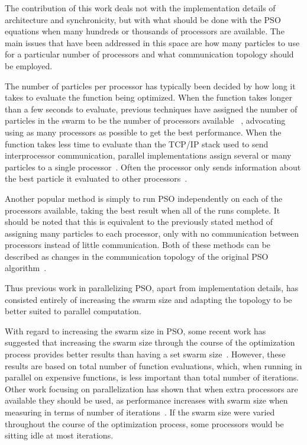 \documentclass[ms]{byuprop}
\begin{document}
The contribution of this work deals not with the implementation details of
architecture and synchronicity, but with what should be done with the PSO
equations when many hundreds or thousands of processors are available.  The
main issues that have been addressed in this space are how many particles to
use for a particular number of processors and what communication topology
should be employed.

The number of particles per processor has typically been decided by how long it
takes to evaluate the function being optimized.  When the function takes longer
than a few seconds to evaluate, previous techniques have assigned the number of
particles in the swarm to be the number of processors available~%
\citep{jin-2005-pso-antenna-designs,mcnabb-2009-large-particle-swarms},
advocating using as many processors as possible to get the best performance.
When the function takes less time to evaluate than the TCP/IP stack used to
send interprocessor communication, parallel implementations assign several or
many particles to a single processor~\citep{chu-2006-intelligent-parallel-pso,
chang-2005-parallel-pso-with-communication-strategies}.  Often the processor
only sends information about the best particle it evaluated to other
processors~\citep{mcnabb-2009-large-particle-swarms}.

Another popular method is simply to run PSO independently on each of the
processors available, taking the best result when all of the runs complete.  It
should be noted that this is equivalent to the previously stated method of
assigning many particles to each processor, only with no communication between
processors instead of little communication.  Both of these methods can be
described as changes in the communication topology of the original PSO
algorithm~\citep{mcnabb-2009-large-particle-swarms}.

Thus previous work in parallelizing PSO, apart from implementation details, has
consisted entirely of increasing the swarm size and adapting the topology to be
better suited to parallel computation.

With regard to increasing the swarm size in PSO, some recent work has suggested
that increasing the swarm size through the course of the optimization process
provides better results than having a set swarm
size~\citep{hsieh-2009-efficient-population-utilization-for-pso,
montes-de-oca-2010-incremental-social-learning-pso}.  However, these results
are based on total number of function evaluations, which, when running in
parallel on expensive functions, is less important than total number of
iterations.  Other work focusing on parallelization has shown that when extra
processors are available they should be used, as performance increases with
swarm size when measuring in terms of number of
iterations~\citep{mcnabb-2009-large-particle-swarms,
jin-2005-pso-antenna-designs}.  If the swarm size were varied throughout the
course of the optimization process, some processors would be sitting idle at
most iterations.
\end{document}
